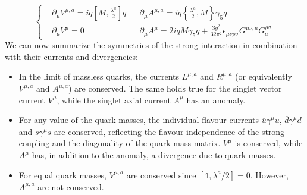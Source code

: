 \documentclass[../main.tex]{subfiles}
\begin{document}
\[
\left\{
\begin{aligned}
&\partial_\mu V^{\mu,a}=i\overline{q}\left[M,\frac{\lambda^a}{2}\right]q &&\partial_\mu A^{\mu,a}=i\overline{q}\left\{\frac{\lambda^a}{2},M\right\}\gamma_5q\\
&\partial_\mu V^\mu=0 
&&\partial_\mu A^\mu=2i\overline{q}M\gamma_5q+\frac{3g^2}{32\pi^2}\epsilon_{\mu\nu\rho\sigma}G^{\mu\nu,a}G^{\rho\sigma}_a
\end{aligned}
\right.
\]
We can now summarize the symmetries of the strong interaction in combination with their currents and divergencies:
\begin{itemize}
    \item In the limit of massless quarks, the currents $L^{\mu,a}$ and $R^{\mu,a}$ (or equivalently $V^{\mu,a}$ and $A^{\mu,a}$) are conserved. The same holds true for the singlet vector current $V^\mu$, while the singlet axial current $A^\mu$ has an anomaly.
    \item For any value of the quark masses, the individual flavour currents $\overline{u}\gamma^\mu u$, $\overline{d}\gamma^\mu d$ and $\overline{s}\gamma^\mu s$ are conserved, reflecting the flavour independence of the strong coupling and the diagonality of the quark mass matrix. $V^\mu$ is conserved, while $A^\mu$ has, in addition to the anomaly, a divergence due to quark masses.
    \item For equal quark masses, $V^{\mu,a}$ are conserved since $[\mathbb{1},\lambda^a/2]=0$. However, $A^{\mu,a}$ are not conserved.
\end{itemize}
\end{document}
